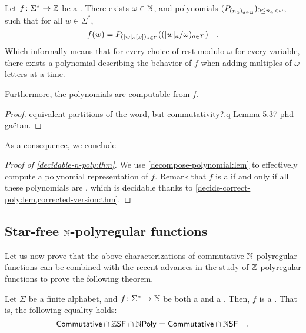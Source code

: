 \documentclass[a4paper,11pt]{article}
\begin{document}
\begin{lemma}
    \label{decompose-polynomial:lem}
    Let $f \colon \Sigma^* \to \mathbb{Z}$ be a 
    . There exists $\omega \in \mathbb{N}$,
    and polynomials $(P_{(n_a)_{a \in \Sigma}})_{ 0 \leq n_a < \omega}$,
    such that for all $w \in \Sigma^*$,
    \begin{equation*}
        f(w) = P_{\seqof{\card[a]{w} [\omega]}{a \in \Sigma}}
        (\seqof{\card[a]{w} / \omega}{a \in \Sigma}) \quad .
    \end{equation*}
    Which informally means that for every choice of rest modulo $\omega$
    for every variable, there exists a polynomial describing the
    behavior of $f$ when adding multiples of $\omega$ letters at a time.

    Furthermore, the polynomials are computable from $f$.
\end{lemma}
\begin{proof}
    equivalent partitions of the word, but commutativity?.q
    Lemma 5.37 phd gaëtan.
\end{proof}

As a consequence, we conclude 
\begin{proof}[Proof of \cref{decidable-n-poly:thm}]
    We use \cref{decompose-polynomial:lem}
    to effectively compute
    a polynomial representation of $f$. Remark that
    $f$ is a  if and only if
    all these polynomials are ,
    which is decidable thanks to
    \cref{decide-correct-poly:lem,corrected-version:thm}.
\end{proof}

\subsection{Star-free $\mathbb{N}$-polyregular functions}


Let us now prove that the above characterizations of
commutative
$\mathbb{N}$-polyregular functions can be combined with the recent
advances in the study of $\mathbb{Z}$-polyregular functions 
\cite{LOPEZ23b}
to prove the following theorem.

\begin{theorem}
    \label{zsf-npoly-nsf:thm}
    Let $\Sigma$ be a finite alphabet, and $f \colon \Sigma^* \to \mathbb{N}$
    be both a 
    and a  .
    Then, $f$ is a  .
    That is, the following equality holds:
    \begin{equation*}
        \ZCommut \cap \ZSF \cap \NPoly
        = \ZCommut \cap \NSF
        \quad .
    \end{equation*}
\end{theorem}
\end{document}
